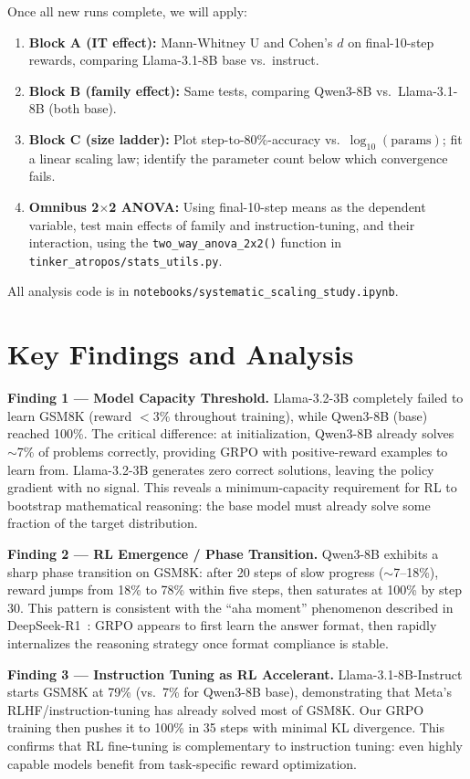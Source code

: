 \documentclass[12pt,a4paper]{report}
\theoremstyle{definition}
\begin{document}
Once all new runs complete, we will apply:
\begin{enumerate}
    \item \textbf{Block A (IT effect):} Mann-Whitney U and Cohen's $d$ on final-10-step rewards, comparing Llama-3.1-8B base vs.\ instruct.
    \item \textbf{Block B (family effect):} Same tests, comparing Qwen3-8B vs.\ Llama-3.1-8B (both base).
    \item \textbf{Block C (size ladder):} Plot step-to-80\%-accuracy vs.\ $\log_{10}(\text{params})$; fit a linear scaling law; identify the parameter count below which convergence fails.
    \item \textbf{Omnibus 2$\times$2 ANOVA:} Using final-10-step means as the dependent variable, test main effects of family and instruction-tuning, and their interaction, using the \texttt{two\_way\_anova\_2x2()} function in \texttt{tinker\_atropos/stats\_utils.py}.
\end{enumerate}

All analysis code is in \texttt{notebooks/systematic\_scaling\_study.ipynb}.

\section{Key Findings and Analysis}
\label{sec:key_findings}

\textbf{Finding 1 --- Model Capacity Threshold.}
Llama-3.2-3B completely failed to learn GSM8K (reward $<$3\% throughout training), while Qwen3-8B (base) reached 100\%. The critical difference: at initialization, Qwen3-8B already solves $\sim$7\% of problems correctly, providing GRPO with positive-reward examples to learn from. Llama-3.2-3B generates zero correct solutions, leaving the policy gradient with no signal. This reveals a minimum-capacity requirement for RL to bootstrap mathematical reasoning: the base model must already solve some fraction of the target distribution.

\textbf{Finding 2 --- RL Emergence / Phase Transition.}
Qwen3-8B exhibits a sharp phase transition on GSM8K: after 20 steps of slow progress ($\sim$7--18\%), reward jumps from 18\% to 78\% within five steps, then saturates at 100\% by step 30. This pattern is consistent with the ``aha moment'' phenomenon described in DeepSeek-R1~\cite{deepseek2025r1}: GRPO appears to first learn the answer format, then rapidly internalizes the reasoning strategy once format compliance is stable.

\textbf{Finding 3 --- Instruction Tuning as RL Accelerant.}
Llama-3.1-8B-Instruct starts GSM8K at 79\% (vs.\ 7\% for Qwen3-8B base), demonstrating that Meta's RLHF/instruction-tuning has already solved most of GSM8K. Our GRPO training then pushes it to 100\% in 35 steps with minimal KL divergence. This confirms that RL fine-tuning is complementary to instruction tuning: even highly capable models benefit from task-specific reward optimization.
\end{document}
